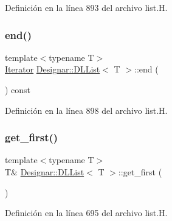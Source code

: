 Definición en la línea 893 del archivo list.\+H.

\mbox{\label{class_designar_1_1_d_l_list_a44bec24be9eb3b3bbfeadc28240a1650}} 
\subsubsection{\texorpdfstring{end()}{end()}\hspace{0.1cm}{\footnotesize\ttfamily [2/2]}}
{\footnotesize\ttfamily template$<$typename T$>$ \\
\hyperlink{class_designar_1_1_d_l_list_1_1_iterator}{Iterator} \hyperlink{class_designar_1_1_d_l_list}{Designar\+::\+D\+L\+List}$<$ T $>$\+::end (\begin{DoxyParamCaption}{ }\end{DoxyParamCaption}) const\hspace{0.3cm}{\ttfamily [inline]}}



Definición en la línea 898 del archivo list.\+H.

\mbox{\label{class_designar_1_1_d_l_list_aa089dc5d48f092cc91d2237606e131e7}} 
\subsubsection{\texorpdfstring{get\+\_\+first()}{get\_first()}\hspace{0.1cm}{\footnotesize\ttfamily [1/2]}}
{\footnotesize\ttfamily template$<$typename T$>$ \\
T\& \hyperlink{class_designar_1_1_d_l_list}{Designar\+::\+D\+L\+List}$<$ T $>$\+::get\+\_\+first (\begin{DoxyParamCaption}{ }\end{DoxyParamCaption})\hspace{0.3cm}{\ttfamily [inline]}}



Definición en la línea 695 del archivo list.\+H.

\mbox{\label{class_designar_1_1_d_l_list_a7dc30042ed6cd04f964504e2ff2e5653}} 
